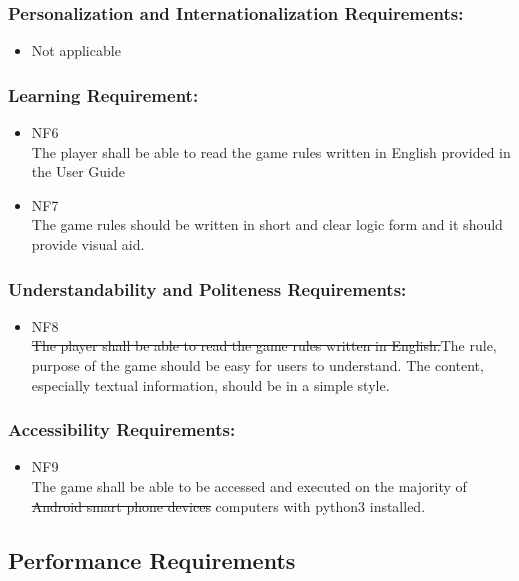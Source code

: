 \documentclass[12pt, titlepage]{article}
\begin{document}
\subsubsection{Personalization and Internationalization Requirements:}
\begin{itemize}
	\item Not applicable
\end{itemize}
\subsubsection{Learning Requirement:}
\begin{itemize}
    \item NF{\color{red}6}\\
    The player shall be able to read the game rules written in English {\color{red} provided in the User Guide}
	\item NF{\color{red}7}\\
	The game rules should be written in short and clear logic form {\color{red} and it should provide visual aid.}
\end{itemize}
\subsubsection{Understandability and Politeness Requirements:}
\begin{itemize}
	\item NF{\color{red}8}\\
	\sout{The player shall be able to read the game rules written in English.}{\color{red}The rule, purpose of the game should be easy for users to understand. The content, especially textual information, should be in a simple style.}
\end{itemize}
\subsubsection{Accessibility Requirements:}
\begin{itemize}
	\item NF{\color{red}9}\\
	The game shall be able to be accessed and executed on the majority of \sout{Android smart phone devices} {\color{red} computers with python3 installed}.
\end{itemize}
\subsection{Performance Requirements}
\end{document}
